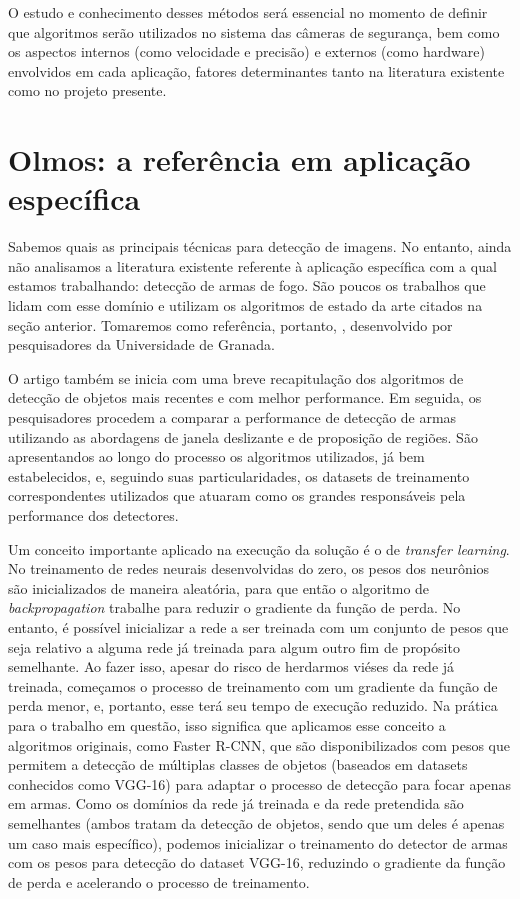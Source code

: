 \documentclass[]{politex}
\begin{document}
O estudo e conhecimento desses métodos será essencial no momento de definir que algoritmos serão utilizados no sistema das câmeras de segurança, bem como os aspectos internos (como velocidade e precisão) e externos (como hardware) envolvidos em cada aplicação, fatores determinantes tanto na literatura existente como no projeto presente.

\section{Olmos: a referência em aplicação específica}

Sabemos quais as principais técnicas para detecção de imagens. No entanto, ainda não analisamos a literatura existente referente à aplicação específica com a qual estamos trabalhando: detecção de armas de fogo. São poucos os trabalhos que lidam com esse domínio e utilizam os algoritmos de estado da arte citados na seção anterior. Tomaremos como referência, portanto, \citeyear{olmos1} \citeauthor{olmos1}, desenvolvido por pesquisadores da Universidade de Granada.

O artigo também se inicia com uma breve recapitulação dos algoritmos de detecção de objetos mais recentes e com melhor performance. Em seguida, os pesquisadores procedem a comparar a performance de detecção de armas utilizando as abordagens de janela deslizante e de proposição de regiões. São apresentandos ao longo do processo os algoritmos utilizados, já bem estabelecidos, e, seguindo suas particularidades, os datasets de treinamento correspondentes utilizados que atuaram como os grandes responsáveis pela performance dos detectores.

Um conceito importante aplicado na execução da solução é o de \textit{transfer learning}. No treinamento de redes neurais desenvolvidas do zero, os pesos dos neurônios são inicializados de maneira aleatória, para que então o algoritmo de \textit{backpropagation} trabalhe para reduzir o gradiente da função de perda. No entanto, é possível inicializar a rede a ser treinada com um conjunto de pesos que seja relativo a alguma rede já treinada para algum outro fim de propósito semelhante. Ao fazer isso, apesar do risco de herdarmos viéses da rede já treinada, começamos o processo de treinamento com um gradiente da função de perda menor, e, portanto, esse terá seu tempo de execução reduzido. Na prática para o trabalho em questão, isso significa que aplicamos esse conceito a algoritmos originais, como Faster R-CNN, que são disponibilizados com pesos que permitem a detecção de múltiplas classes de objetos (baseados em datasets conhecidos como VGG-16) para adaptar o processo de detecção para focar apenas em armas. Como os domínios da rede já treinada e da rede pretendida são semelhantes (ambos tratam da detecção de objetos, sendo que um deles é apenas um caso mais específico), podemos inicializar o treinamento do detector de armas com os pesos para detecção do dataset VGG-16\cite{vgg16}, reduzindo o gradiente da função de perda e acelerando o processo de treinamento.
\end{document}
